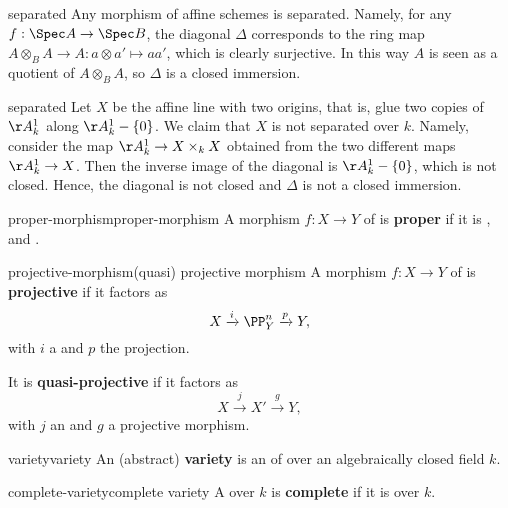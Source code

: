 \begin{example}{separated}
    Any morphism of affine schemes is separated. Namely, for any $f : \Spec A \to \Spec B$, the diagonal $\Delta$ corresponds to the ring map $A \otimes_B A \to A : a \otimes a' \mapsto aa'$, which is clearly surjective. In this way $A$ is seen as a quotient of $A \otimes_B A$, so $\Delta$ is a closed immersion.
\end{example}

\begin{example}{separated}
    Let $X$ be the affine line with two origins, that is, glue two copies of $\AA_k^1$ along $\AA_k^1 - \{ 0 \}$. We claim that $X$ is not separated over $k$. Namely, consider the map $\AA^1_k \to X \times_k X$ obtained from the two different maps $\AA_k^1 \to X$. Then the inverse image of the diagonal is $\AA_k^1 - \{ 0 \}$, which is not closed. Hence, the diagonal is not closed and $\Delta$ is not a closed immersion.
\end{example}

\begin{topic}{proper-morphism}{proper-morphism}
    A morphism $f : X \to Y$ of  is \textbf{proper} if it is ,  and .
\end{topic}

\begin{topic}{projective-morphism}{(quasi) projective morphism}
    A morphism $f : X \to Y$ of  is \textbf{projective} if it factors as
    \[ X \xrightarrow{i} \PP^n_Y \xrightarrow{p} Y , \]
    with $i$ a  and $p$ the projection.
    
    It is \textbf{quasi-projective} if it factors as
    \[ X \xrightarrow{j} X' \xrightarrow{g} Y , \]
    with $j$ an  and $g$ a projective morphism.
\end{topic}

\begin{topic}{variety}{variety}
    An (abstract) \textbf{variety} is an    of  over an algebraically closed field $k$.
\end{topic}

\begin{topic}{complete-variety}{complete variety}
    A  over $k$ is \textbf{complete} if it is  over $k$.
\end{topic}

